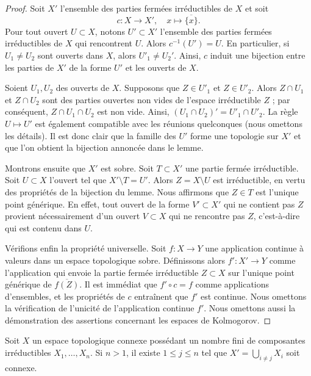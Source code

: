 \begin{proof}
Soit $X'$ l'ensemble des parties fermées irréductibles de $X$ et soit
$$
c : X \to X', \quad x \mapsto \overline{\{x\}}.
$$
Pour tout ouvert $U \subset X$, notons $U' \subset X'$ l'ensemble des
parties fermées irréductibles de $X$ qui rencontrent $U$.
Alors $c^{-1}(U') = U$. En particulier, si $U_1 \not = U_2$ sont ouverts dans
$X$, alors $U'_1 \not = U_2'$. Ainsi, $c$ induit une bijection entre les
parties de $X'$ de la forme $U'$ et les ouverts de $X$.

\medskip\noindent
Soient $U_1, U_2$ des ouverts de $X$. Supposons que $Z \in U'_1$ et
$Z \in U'_2$. Alors $Z \cap U_1$ et $Z \cap U_2$ sont des parties ouvertes
non vides de l'espace irréductible $Z$ ; par conséquent,
$Z \cap U_1 \cap U_2$ est non vide. Ainsi,
$(U_1 \cap U_2)' = U'_1 \cap U'_2$.
La règle $U \mapsto U'$ est également compatible avec les réunions
quelconques (nous omettons les détails). Il est donc clair que la famille des
$U'$ forme une topologie sur $X'$ et que l'on obtient la bijection annoncée
dans le lemme.

\medskip\noindent
Montrons ensuite que $X'$ est sobre. Soit $T \subset X'$ une partie fermée
irréductible. Soit $U \subset X$ l'ouvert tel que $X' \setminus T = U'$.
Alors $Z = X \setminus U$ est irréductible, en vertu des propriétés de la
bijection du lemme. Nous affirmons que $Z \in T$ est l'unique point générique.
En effet, tout ouvert de la forme $V' \subset X'$ qui ne contient pas $Z$
provient nécessairement d'un ouvert $V \subset X$ qui ne rencontre pas $Z$,
c'est-à-dire qui est contenu dans $U$.

\medskip\noindent
Vérifions enfin la propriété universelle. Soit $f : X \to Y$ une application
continue à valeurs dans un espace topologique sobre. Définissons alors
$f' : X' \to Y$ comme l'application qui envoie la partie fermée irréductible
$Z \subset X$ sur l'unique point générique de $\overline{f(Z)}$.
Il est immédiat que $f' \circ c = f$ comme applications d'ensembles, et les
propriétés de $c$ entraînent que $f'$ est continue. Nous omettons la
vérification de l'unicité de l'application continue $f'$. Nous omettons aussi
la démonstration des assertions concernant les espaces de Kolmogorov.
\end{proof}

\begin{lemma}
\label{lemma-remove-irreducible-connected}
Soit $X$ un espace topologique connexe possédant un nombre fini de composantes
irréductibles $X_1, \ldots, X_n$. Si $n > 1$, il existe
$1 \leq j \leq n$ tel que $X' = \bigcup_{i \not = j} X_i$ soit connexe.
\end{lemma}

